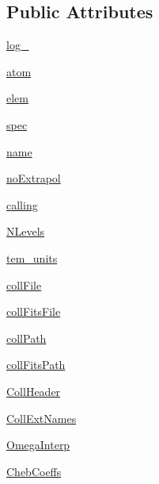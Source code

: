 \subsection*{Public Attributes}
\begin{DoxyCompactItemize}
\item 
\hyperlink{classpyneb_1_1core_1_1pynebcore_1_1___coll_data_fits_a42f3e78e841a8714f2602866843d77da}{log\-\_\-}
\item 
\hyperlink{classpyneb_1_1core_1_1pynebcore_1_1___coll_data_fits_a8bbd2e846954f94878e90ebdf0e51772}{atom}
\item 
\hyperlink{classpyneb_1_1core_1_1pynebcore_1_1___coll_data_fits_ac34163e88a48564f05f1cf5aa8d4683a}{elem}
\item 
\hyperlink{classpyneb_1_1core_1_1pynebcore_1_1___coll_data_fits_a781126fa0e5b9bb0a4f6ae5afe4fd9a9}{spec}
\item 
\hyperlink{classpyneb_1_1core_1_1pynebcore_1_1___coll_data_fits_a40d926369df2d46e0799a66e4c9d9a73}{name}
\item 
\hyperlink{classpyneb_1_1core_1_1pynebcore_1_1___coll_data_fits_a97b30abb66948d40dc2077a3c3b15231}{no\-Extrapol}
\item 
\hyperlink{classpyneb_1_1core_1_1pynebcore_1_1___coll_data_fits_a43c9d096f9508cb475cb4fc3552e1979}{calling}
\item 
\hyperlink{classpyneb_1_1core_1_1pynebcore_1_1___coll_data_fits_a64b97a86b4dfb53e4cba3ce8ac0fdf00}{N\-Levels}
\item 
\hyperlink{classpyneb_1_1core_1_1pynebcore_1_1___coll_data_fits_a0ec412b766393f099d604527da57c565}{tem\-\_\-units}
\item 
\hyperlink{classpyneb_1_1core_1_1pynebcore_1_1___coll_data_fits_a2f7b35cc563095fb2a894b2cc994cfe5}{coll\-File}
\item 
\hyperlink{classpyneb_1_1core_1_1pynebcore_1_1___coll_data_fits_ae3c29d8fc35102d34f04c618f578cd86}{coll\-Fits\-File}
\item 
\hyperlink{classpyneb_1_1core_1_1pynebcore_1_1___coll_data_fits_ad08da92d019bbc87139f04fb7d765411}{coll\-Path}
\item 
\hyperlink{classpyneb_1_1core_1_1pynebcore_1_1___coll_data_fits_a6a16fc5f5206b988d99be1511d158ada}{coll\-Fits\-Path}
\item 
\hyperlink{classpyneb_1_1core_1_1pynebcore_1_1___coll_data_fits_ac869d4a1a70ad7d42881b0e19a69ab4c}{Coll\-Header}
\item 
\hyperlink{classpyneb_1_1core_1_1pynebcore_1_1___coll_data_fits_a5526868efdb550fee08608f77262b106}{Coll\-Ext\-Names}
\item 
\hyperlink{classpyneb_1_1core_1_1pynebcore_1_1___coll_data_fits_a3e15df449393d23d1ac760671b5828cc}{Omega\-Interp}
\item 
\hyperlink{classpyneb_1_1core_1_1pynebcore_1_1___coll_data_fits_af8eaa90b2ddbf77c0a78b648e9f66971}{Cheb\-Coeffs}
\end{DoxyCompactItemize}
